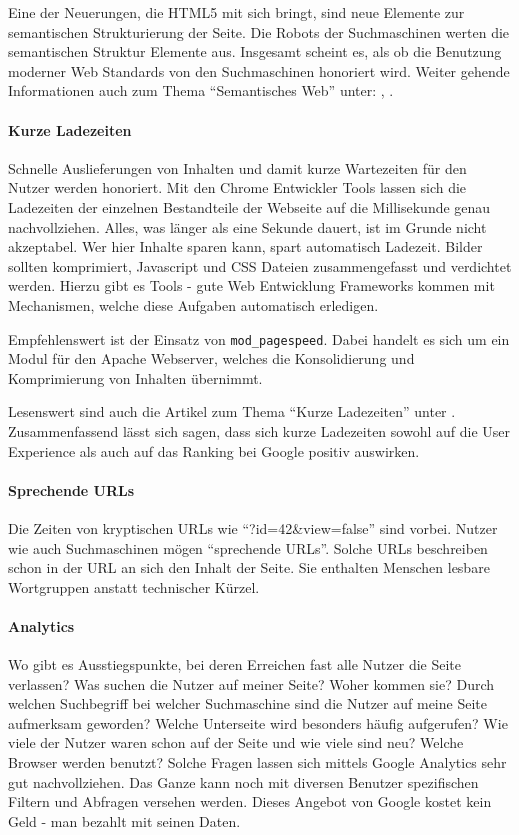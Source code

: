 \documentclass[ngerman, 12pt, a4paper]{scrartcl}
\begin{document}
Eine der Neuerungen, die HTML5 mit sich bringt, sind neue Elemente zur semantischen Strukturierung
der Seite. Die Robots der Suchmaschinen werten die semantischen Struktur Elemente aus. Insgesamt
scheint es, als ob die Benutzung moderner Web Standards von den Suchmaschinen honoriert wird. Weiter
gehende Informationen auch zum Thema ``Semantisches Web'' unter: \cite{html5}, \cite{semantisches_web}.

\paragraph*{Kurze Ladezeiten}
Schnelle Auslieferungen von Inhalten und damit kurze Wartezeiten für den Nutzer werden honoriert.
Mit den Chrome Entwickler Tools lassen sich die Ladezeiten der einzelnen Bestandteile der Webseite
auf die Millisekunde genau nachvollziehen. Alles, was länger als eine Sekunde dauert, ist im Grunde nicht
akzeptabel. Wer hier Inhalte sparen kann, spart automatisch Ladezeit. Bilder sollten komprimiert,
Javascript und CSS Dateien zusammengefasst und verdichtet werden. Hierzu gibt es Tools - gute Web
Entwicklung Frameworks kommen mit Mechanismen, welche diese Aufgaben automatisch erledigen.\newline

Empfehlenswert ist der Einsatz von \texttt{mod\_pagespeed}. Dabei handelt es sich um ein Modul für
den Apache Webserver, welches die Konsolidierung und Komprimierung von Inhalten übernimmt.
\cite{pagespeed}\newline

Lesenswert sind auch die Artikel zum Thema ``Kurze Ladezeiten'' unter \cite{speed}. Zusammenfassend
lässt sich sagen, dass sich kurze Ladezeiten sowohl auf die User Experience als auch auf das Ranking
bei Google positiv auswirken.

\paragraph*{Sprechende URLs}
Die Zeiten von kryptischen URLs wie ``?id=42\&view=false'' sind vorbei. Nutzer wie
auch Suchmaschinen mögen ``sprechende URLs''. Solche URLs beschreiben schon in der URL an sich den
Inhalt der Seite. Sie enthalten Menschen lesbare Wortgruppen anstatt technischer Kürzel. \cite{speaking_urls}

\paragraph*{Analytics}
Wo gibt es Ausstiegspunkte, bei deren Erreichen fast alle Nutzer die Seite verlassen? Was suchen
die Nutzer auf meiner Seite? Woher kommen sie? Durch welchen Suchbegriff bei welcher Suchmaschine
sind die Nutzer auf meine Seite aufmerksam geworden? Welche Unterseite wird besonders häufig
aufgerufen? Wie viele der Nutzer waren schon auf der Seite und wie viele sind neu? Welche Browser
werden benutzt? Solche Fragen lassen sich mittels Google Analytics sehr gut nachvollziehen. Das Ganze kann
noch mit diversen Benutzer spezifischen Filtern und Abfragen versehen werden. Dieses Angebot von
Google kostet kein Geld - man bezahlt mit seinen Daten. \cite{analytics}

\newpage
\printbibliography[title=Ressourcen]
\end{document}
